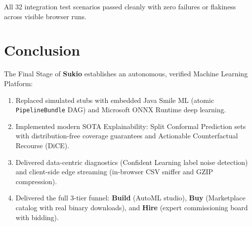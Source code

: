 \documentclass[11pt,a4paper]{article}
\begin{document}
All 32 integration test scenarios passed cleanly with zero failures or flakiness across visible browser runs.

\section{Conclusion}
The Final Stage of \textbf{Sukio} establishes an autonomous, verified Machine Learning Platform:
\begin{enumerate}[leftmargin=0.7cm]
  \item Replaced simulated stubs with embedded Java Smile ML (atomic \texttt{PipelineBundle} DAG) and Microsoft ONNX Runtime deep learning.
  \item Implemented modern SOTA Explainability: Split Conformal Prediction sets with distribution-free coverage guarantees and Actionable Counterfactual Recourse (DiCE).
  \item Delivered data-centric diagnostics (Confident Learning label noise detection) and client-side edge streaming (in-browser CSV sniffer and GZIP compression).
  \item Delivered the full 3-tier funnel: \textbf{Build} (AutoML studio), \textbf{Buy} (Marketplace catalog with real binary downloads), and \textbf{Hire} (expert commissioning board with bidding).
\end{enumerate}
\end{document}
